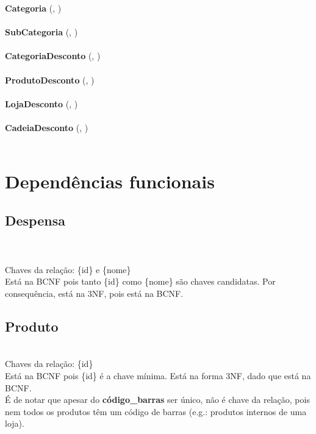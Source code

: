 \documentclass{report}
\begin{document}
\textbf{Categoria} (,
)\\\\

\textbf{SubCategoria} (,
)\\\\

\textbf{CategoriaDesconto} (,
)\\\\

\textbf{ProdutoDesconto} (,
)\\\\

\textbf{LojaDesconto} (,
)\\\\

\textbf{CadeiaDesconto} (,
)\\\\

\section{Dependências funcionais}

\subsection{Despensa}
\\
\\
\newline
Chaves da relação: \{id\} e \{nome\}\\
Está na BCNF pois tanto \{id\} como \{nome\} são chaves candidatas. Por
consequência, está na 3NF, pois está na BCNF.

\subsection{Produto}
\\
\newline
Chaves da relação: \{id\}\\
Está na BCNF pois \{id\} é a chave mínima. Está na forma 3NF, dado que está
na BCNF.\\
É de notar que apesar do \textbf{código\_barras} ser único, não é chave
da relação, pois nem todos os produtos têm um código de barras (e.g.:
produtos internos de uma loja).
\end{document}
